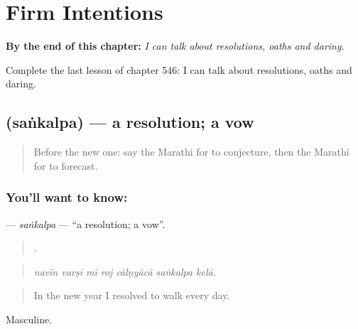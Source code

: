 
\chapter{Firm Intentions}
\label{ch:mr-firm-intentions}

\begin{chapteropening}
\textbf{By the end of this chapter:} \emph{I can talk about resolutions, oaths and daring.}

Complete the last lesson of chapter 546: I can talk about resolutions, oaths and daring.
\end{chapteropening}

\section[\texorpdfstring{\mr{संकल्प} (saṅkalpa)}{संकल्प (saṅkalpa)}]{ (saṅkalpa) — a resolution; a vow}

\label{lesson:MR-C546-sankalpa}



\begin{quote}
Before the new one: say the Marathi for to conjecture, then the Marathi for to forecast.
\end{quote}

\subsection*{You'll want to know: }
\textbf{} — \emph{saṅkalpa} — \textquotedblleft{}a resolution; a vow\textquotedblright{}.

\begin{quote}
      .
\end{quote}

\begin{quote}
\emph{navīn varṣī mī roj cālṇyācā saṅkalpa kelā.}
\end{quote}

\begin{quote}
In the new year I resolved to walk every day.
\end{quote}

Masculine.

